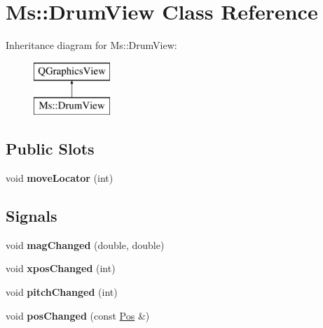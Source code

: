 \hypertarget{class_ms_1_1_drum_view}{}\section{Ms\+:\+:Drum\+View Class Reference}
\label{class_ms_1_1_drum_view}
Inheritance diagram for Ms\+:\+:Drum\+View\+:\begin{figure}[H]
\begin{center}
\leavevmode
\includegraphics[height=2.000000cm]{class_ms_1_1_drum_view}
\end{center}
\end{figure}
\subsection*{Public Slots}
\begin{DoxyCompactItemize}
\item 
\mbox{\label{class_ms_1_1_drum_view_a16cdb58a3ce6db535883560486416017}} 
void {\bfseries move\+Locator} (int)
\end{DoxyCompactItemize}
\subsection*{Signals}
\begin{DoxyCompactItemize}
\item 
\mbox{\label{class_ms_1_1_drum_view_a0b576a3f223ffb0482d7274f38a28643}} 
void {\bfseries mag\+Changed} (double, double)
\item 
\mbox{\label{class_ms_1_1_drum_view_a274c44de549de37e1de5f1202a4dbc43}} 
void {\bfseries xpos\+Changed} (int)
\item 
\mbox{\label{class_ms_1_1_drum_view_a23007cbb1c4c817ee1e67894a839367c}} 
void {\bfseries pitch\+Changed} (int)
\item 
\mbox{\label{class_ms_1_1_drum_view_a37e7aacfb94a38d1349e6159329ef611}} 
void {\bfseries pos\+Changed} (const \hyperlink{class_ms_1_1_pos}{Pos} \&)
\end{DoxyCompactItemize}
